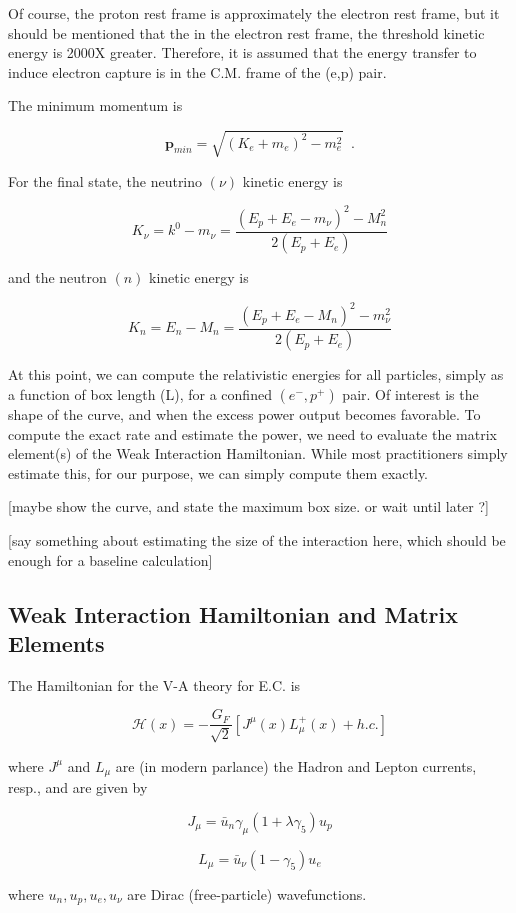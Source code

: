 \documentclass[%
 aip,
 jmp,%
 amsmath,amssymb,
 reprint,%
]{revtex4-1}
\begin{document}
Of course, the proton rest frame is approximately the electron rest frame, but it should be mentioned that the in the electron rest frame, the threshold kinetic energy is 2000X greater.  Therefore, it is assumed that the energy transfer to induce electron capture is in the C.M. frame of the (e,p) pair.

The minimum momentum is 

$$\mathbf{p}_{min}=\sqrt{(K_{e}+m_{e})^{2}-m_{e}^{2}}\;\;.$$

For the final state, the neutrino $(\nu)$ kinetic energy is

$$K_{\nu}=k^{0}-m_{\nu}=\dfrac{(E_{p}+E_{e}-m_{\nu})^{2}-M^{2}_{n}}{2(E_{p}+E_{e})}$$

and the neutron $(n)$ kinetic energy is

$$K_{n}=E_{n}-M_{n}=\dfrac{(E_{p}+E_{e}-M_{n})^{2}-m^{2}_{\nu}}{2(E_{p}+E_{e})}$$

At this point, we can compute the relativistic energies for all particles, simply as a function of box length (L), for a confined $(e^{-},p^{+})$ pair.  Of interest is the shape of the curve, and when the excess power output becomes favorable.  To compute the exact rate and estimate the power, we need to evaluate the matrix element(s) of the Weak Interaction Hamiltonian.  
While most practitioners simply estimate this, for our purpose, we can simply compute them exactly.

[maybe show the curve, and state the maximum box size. or wait until later ?]  

[say something about estimating the size of the interaction here, which should be enough for a baseline calculation]


\subsection{Weak Interaction Hamiltonian and Matrix Elements}

The Hamiltonian for the V-A theory for E.C. is \cite{ec-review1,ec-review2} 

$$\mathcal{H}(x)=-\dfrac{G_{F}}{\sqrt{2}}\left[J^{\mu}(x)L^{+}_{\mu}(x)+h.c.\right]$$

where $J^{\mu}$ and $L_{\mu}$ are (in modern parlance) the Hadron and Lepton currents, resp., and are given by

$$J_{\mu}=\bar{u}_{n}\gamma_{\mu}(1+\lambda\gamma_{5})u_{p}$$

$$L_{\mu}=\bar{u}_{\nu}(1-\gamma_{5})u_{e}$$

where $u_{n},u_{p},u_{e},u_{\nu}$ are Dirac (free-particle) wavefunctions.   
\end{document}
